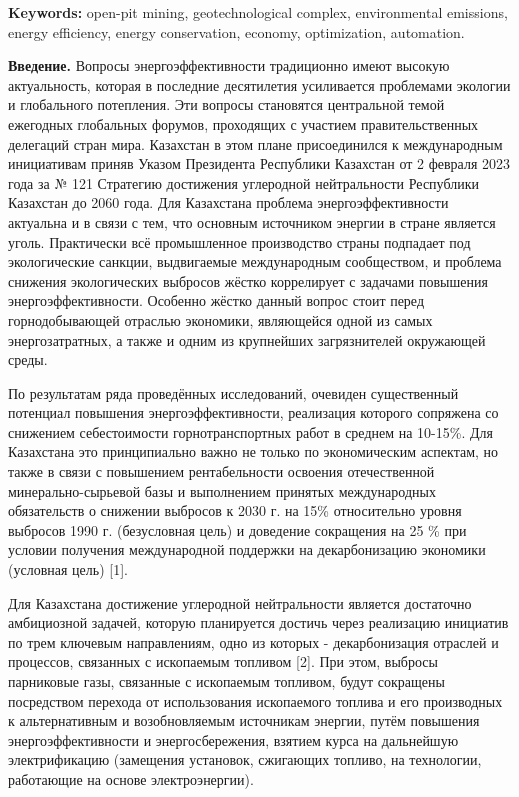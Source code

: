 {\bfseries Keywords:} open-pit mining, geotechnological complex,
environmental emissions, energy efficiency, energy conservation,
economy, optimization, automation.

\begin{multicols}{2}
{\bfseries Введение.} Вопросы энергоэффективности традиционно имеют высокую
актуальность, которая в последние десятилетия усиливается проблемами
экологии и глобального потепления. Эти вопросы становятся центральной
темой ежегодных глобальных форумов, проходящих с участием
правительственных делегаций стран мира. Казахстан в этом плане
присоединился к международным инициативам приняв Указом Президента
Республики Казахстан от 2 февраля 2023 года за № 121 Стратегию
достижения углеродной нейтральности Республики Казахстан до 2060 года.
Для Казахстана проблема энергоэффективности актуальна и в связи с тем,
что основным источником энергии в стране является уголь. Практически всё
промышленное производство страны подпадает под экологические санкции,
выдвигаемые международным сообществом, и проблема снижения экологических
выбросов жёстко коррелирует с задачами повышения энергоэффективности.
Особенно жёстко данный вопрос стоит перед горнодобывающей отраслью
экономики, являющейся одной из самых энергозатратных, а также и одним из
крупнейших загрязнителей окружающей среды.

По результатам ряда проведённых исследований, очевиден существенный
потенциал повышения энергоэффективности, реализация которого сопряжена
со снижением себестоимости горнотранспортных работ в среднем на 10-15\%.
Для Казахстана это принципиально важно не только по экономическим
аспектам, но также в связи с повышением рентабельности освоения
отечественной минерально-сырьевой базы и выполнением принятых
международных обязательств о снижении выбросов к 2030 г. на 15\%
относительно уровня выбросов 1990 г. (безусловная цель) и доведение
сокращения на 25 \% при условии получения международной поддержки на
декарбонизацию экономики (условная цель) {[}1{]}.

Для Казахстана достижение углеродной нейтральности является достаточно
амбициозной задачей, которую планируется достичь через реализацию
инициатив по трем ключевым направлениям, одно из которых -
декарбонизация отраслей и процессов, связанных с ископаемым топливом
{[}2{]}. При этом, выбросы парниковые газы, связанные с ископаемым
топливом, будут сокращены посредством перехода от использования
ископаемого топлива и его производных к альтернативным и возобновляемым
источникам энергии, путём повышения энергоэффективности и
энергосбережения, взятием курса на дальнейшую электрификацию (замещения
установок, сжигающих топливо, на технологии, работающие на основе
электроэнергии).


\end{multicols}
